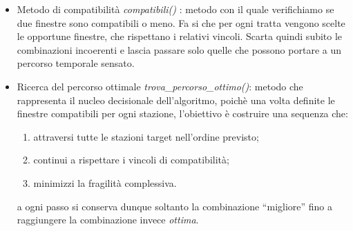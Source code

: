 \documentclass[a4paper,12pt]{report}
\begin{document}
    \begin{itemize}
    \item Metodo di compatibilità \textit{compatibili()} : metodo con il quale verifichiamo se due finestre sono compatibili o meno. Fa si che per ogni tratta vengono scelte le opportune finestre, che rispettano i relativi vincoli. Scarta quindi subito le combinazioni incoerenti e lascia passare solo quelle che possono portare a un percorso temporale sensato.
    \item Ricerca del percorso ottimale \textit{trova\_percorso\_ottimo()}: metodo che rappresenta il nucleo decisionale dell'algoritmo, poichè una volta definite le finestre compatibili per ogni stazione, l’obiettivo è costruire una sequenza che:
        \begin{enumerate}
            \item attraversi tutte le stazioni target nell’ordine previsto;
            \item continui a rispettare i vincoli di compatibilità;
            \item minimizzi la fragilità complessiva.
        \end{enumerate}
        a ogni passo si conserva dunque soltanto la combinazione “migliore” fino a raggiungere la combinazione invece \textit{ottima}.
        \end{itemize}
   
\end{document}
